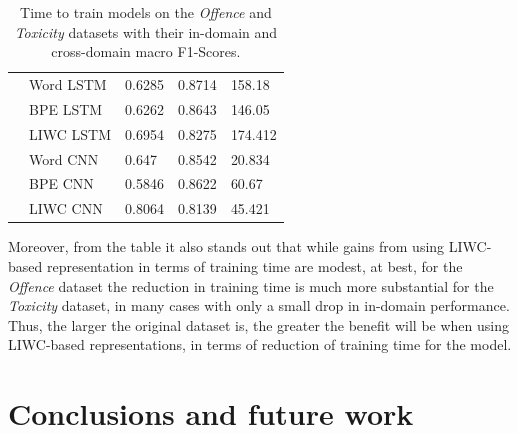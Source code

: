 \begin{table}[h]
\begin{tabular}{c|llll}
                                            & Word LSTM & 0.6285           & 0.8714            & 158.18  \\
                                            & BPE LSTM  & 0.6262           & 0.8643            & 146.05  \\
                                            & LIWC LSTM & 0.6954           & 0.8275            & 174.412 \\
                                            & Word CNN  & 0.647            & 0.8542            & 20.834  \\
                                            & BPE CNN   & 0.5846           & 0.8622            & 60.67   \\
                                            & LIWC CNN  & 0.8064           & 0.8139            & 45.421
\end{tabular}%
\caption{Time to train models on the \textit{Offence} and \textit{Toxicity} datasets with their in-domain and cross-domain macro F1-Scores.}
\label{tab:time_spent_davidson_wulczyn}
\end{table}

Moreover, from the table it also stands out that while gains from using LIWC-based representation in terms of training time are modest, at best, for the \textit{Offence} dataset the reduction in training time is much more substantial for the \textit{Toxicity} dataset, in many cases with only a small drop in in-domain performance. Thus, the larger the original dataset is, the greater the benefit will be when using LIWC-based representations, in terms of reduction of training time for the model.

\section{Conclusions and future work}

